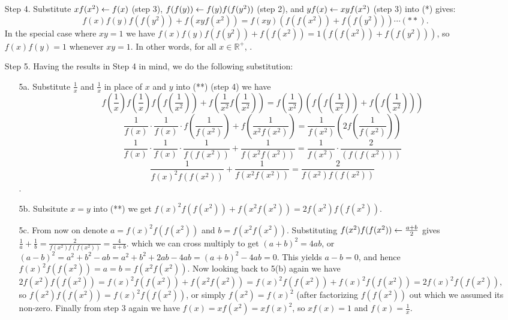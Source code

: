 \documentclass[11pt,a4paper]{article}
\begin{document}
\begin{itemize}
\begin{itemize}
\item [Step 4.]
Substitute $xf(x^2)\leftarrow f(x)$ (step 3), $f(f(y))\leftarrow f(y)f(f(y^2))$ (step 2), and $yf(x)\leftarrow xyf(x^2)$ (step 3) into (*) gives: 
$$f(x)f(y)f(f(y^2)) + f(xyf(x^2)) = f(xy) \left(f(f(x^2)) + f(f(y^2))\right)\cdots(**).$$
In the special case where $xy=1$ we have $f(x)f(y)f(f(y^2)) + f(f(x^2)) = 1 \left(f(f(x^2)) + f(f(y^2))\right)$, 
so $f(x)f(y)=1$ whenever $xy=1$. 
In other words, for all $x\in\mathbb{R}^+$, . 

\item [Step 5.]
Having the results in Step 4 in mind, we do the following substitution: 
\begin{itemize}
\item [5a.]
Substitute $\frac 1x$ and $\frac 1x$ in place of $x$ and $y$ into (**) (step 4) we have
$$f\left(\frac 1x\right)f\left(\frac 1x\right)f\left(f\left(\frac 1{x^2}\right)\right) + f\left(\frac 1{x^2}f\left(\frac 1{x^2}\right)\right)
= f\left(\frac 1{x^2}\right) \left(f\left(f\left(\frac 1{x^2}\right)\right) + f\left(f\left(\frac 1{x^2}\right)\right)\right)$$
\[\frac1{f(x)}\cdot \frac1{f(x)}\cdot f\left(\frac 1{f(x^2)}\right)+f\left(\frac 1{x^2f(x^2)}\right)
=\frac1{f(x^2)}\left(2f\left(\frac 1{f(x^2)}\right)\right)\]
\[\frac1{f(x)}\cdot \frac1{f(x)}\cdot \frac 1{f\left(f(x^2)\right)}+\frac 1{f\left(x^2f(x^2)\right)}
=\frac1{f(x^2)}\cdot \frac 2{\left(f\left(f(x^2)\right)\right)}\]
\[\frac 1{f(x)^2 f(f(x^2))}+ \frac 1{f(x^2f(x^2))}
= \frac 2{f(x^2)f(f(x^2))}\]. 
\item [5b.]
Subsitute $x=y$ into (**) we get 
$f(x)^2f(f(x^2)) + f(x^2f(x^2)) = 2f(x^2) f(f(x^2)).$
\item [5c.]
From now on denote $a=f(x)^2f(f(x^2))$ and $b=f(x^2f(x^2))$. 
Substituting $f(x^2) f(f(x^2))\leftarrow \frac{a + b} 2$ gives 
$\frac 1{a}+ \frac 1{b}=\frac 2{f(x^2)f(f(x^2))}=\frac 4{a+b}.$
which we can cross multiply to get 
$(a+b)^2=4ab$, or $(a-b)^2=a^2+b^2-ab=a^2+b^2+2ab-4ab=(a+b)^2-4ab=0$. 
This yields $a-b=0$, and hence 
$f(x)^2f(f(x^2))=a=b=f(x^2f(x^2))$. 
Now looking back to 5(b) again we have 
$2f(x^2) f(f(x^2)) = f(x)^2f(f(x^2)) + f(x^2f(x^2)) = f(x)^2f(f(x^2)) + f(x)^2f(f(x^2))=2f(x)^2f(f(x^2)),$ 
so $f(x^2) f(f(x^2))=f(x)^2 f(f(x^2))$, or simply 
$f(x^2)=f(x)^2$ (after factorizing $f(f(x^2))$ out which we assumed its non-zero. 
Finally from step 3 again we have 
$f(x)=xf(x^2)=xf(x)^2$, so $xf(x)=1$ and $f(x)=\frac 1x$. 

\end{itemize}
\end{itemize}


\end{itemize}
\end{document}
